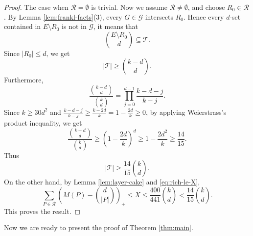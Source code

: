 \documentclass[11pt]{article}
\numberwithin{equation}{section}
\begin{document}
\begin{proof}
	The case when $\mathcal R=\emptyset$ is trivial.  Now we assume $\mathcal R\ne\emptyset$, and choose $R_0\in\mathcal R$.  By Lemma \ref{lem:frankl-facts}(3), every $G\in\mathcal G$ intersects $R_0$.  Hence every $d$-set contained in $E\setminus R_0$ is not in $\mathcal G$, it means that
	\[
	\binom{E\setminus R_0}{d}\subseteq \mathcal{T}.
	\]
	Since $|R_0|\le d$, we get
	\begin{equation}\label{eq:T-lower}
		|\mathcal{T}|\ge \binom{k-d}{d}.
	\end{equation}
	Furthermore,
	\[
	\frac{\binom{k-d}{d}}{\binom{k}{d}}
	=
	\prod_{j=0}^{d-1}\frac{k-d-j}{k-j}.
	\]
Since $k\ge30d^2$ and $\frac{k-d-j}{k-j}\ge\frac{k-2d}{k}=1-\frac{2d}{k}\ge0$, by applying Weierstrass’s product inequality,  we get
	\[
	\frac{\binom{k-d}{d}}{\binom{k}{d}}
	\ge
	\left(1-\frac{2d}{k}\right)^d
	\ge
	1-\frac{2d^2}{k}
	\ge
	\frac{14}{15}.
	\]
	Thus
	\begin{equation}\label{eq:T-ratio}
		|\mathcal{T}|\ge \frac{14}{15}\binom{k}{d}.
	\end{equation}
	On the other hand, by Lemma \ref{lem:layer-cake} and \eqref{eq:rich-le-X},
	\[
	\sum_{P\in\mathcal R}
	\left(M(P)-\binom{d}{|P|}\right)_+
	\le
	X
	\le
	\frac{400}{441}\binom{k}{d}< \frac{14}{15}\binom{k}{d}.
	\]
	This proves the result.
\end{proof}

\smallskip

Now we are ready to present the proof of Theorem \ref{thm:main}.
\end{document}
